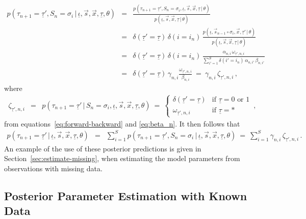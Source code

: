 \documentclass[a4paper]{article}
\begin{document}
\begin{eqnarray}
    p(\tau_{n+1}\!=\!\underline{\tau}',S_n\!=\!\sigma_i\,|\,\underline{\iota},\vec{s},\vec{x},\underline{\tau},\theta) 
& = &
   \frac{p(\tau_{n+1}\!=\!\underline{\tau}',S_n\!=\!\sigma_i,\underline{\iota},\vec{s},\vec{x},\underline{\tau}\,|\,\theta) }
           {p(\underline{\iota},\vec{s},\vec{x},\underline{\tau}\,|\,\theta) }
\nonumber\\& = &
\delta(\underline{\tau}'\!=\!\underline{\tau})\,\delta(i\!=\!i_n)\,
\frac{p(\underline{\iota},\vec{s}_{n-1}\circ\sigma_i,\vec{x},\underline{\tau}'\,|\,\theta) }
       {p(\underline{\iota},\vec{s},\vec{x},\underline{\tau}\,|\,\theta) }
\nonumber\\& = &
\delta(\underline{\tau}'\!=\!\underline{\tau})\,\delta(i\!=\!i_n)\,
\frac{\alpha_{n,i}\,\omega_{\underline{\tau}',n,i}}
{\sum_{i'=1}^S\delta(i'\!=\!i_n)\,\alpha_{n,i'}\,\beta_{n,i'}}
\nonumber\\& = &
\delta(\underline{\tau}'\!=\!\underline{\tau})\,\gamma_{n,i}\frac{\omega_{\underline{\tau}',n,i}}{\beta_{n,i}}
~=~\gamma_{n,i}\,\zeta_{\underline{\tau}',n,i}
\,,
\label{eq:p_tnp1_sn_g_v}
\end{eqnarray}
where
\begin{eqnarray}
  \zeta_{\underline{\tau}',n,i} & = &
    p(\tau_{n+1}\!=\!\underline{\tau}'\,|\,S_n\!=\!\sigma_i,\underline{\iota},\vec{s},\vec{x},\underline{\tau},\theta) 
~=~\left\{\begin{array}{ll}
\delta(\underline{\tau}'\!=\!\underline{\tau}) & \mbox{if } \underline{\tau}=0 \mbox{ or } 1\\
\omega_{\underline{\tau}',n,i} & \mbox{if } \underline{\tau}=*
\end{array}\right.\,,
\end{eqnarray}
from equations~\eqref{eq:forward-backward} and \eqref{eq:beta_n}. It then follows that
\begin{eqnarray}
    p(\tau_{n+1}\!=\!\underline{\tau}'\,|\,\underline{\iota},\vec{s},\vec{x},\underline{\tau},\theta) 
& = &
    \sum_{i=1}^S p(\tau_{n+1}\!=\!\underline{\tau}',S_n\!=\!\sigma_i\,|\,\underline{\iota},\vec{s},\vec{x},\underline{\tau},\theta) 
~=~\sum_{i=1}^S \gamma_{n,i}\,\zeta_{\underline{\tau}',n,i}
\,.
\end{eqnarray}
An example of the use of these posterior predictions is given in Section~\ref{sec:estimate-missing}, when estimating the model parameters from 
observations with missing data.

\subsection{Posterior Parameter Estimation with Known Data}\label{sec:estimate-known}
\end{document}
